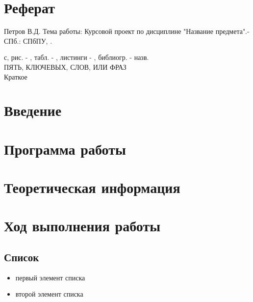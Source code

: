 




\section*{\centering Реферат}

Петров В.Д. Тема работы: Курсовой проект по дисциплине "Название предмета".- СПб.: СПбПУ, \the\year. \begin{NoHyper}{\pageref{LastPage}}\end{NoHyper}  с, рис. - \totalfigures{}, табл. - \totaltables{}, листинги - , библиогр. -  назв.\\[1cm]

ПЯТЬ, КЛЮЧЕВЫХ, СЛОВ, ИЛИ ФРАЗ\\

Краткое 

\thispagestyle{empty} %
\newpage



\renewcommand\contentsname{\centerline{Содержание}}
\tableofcontents
\newpage



\section*{Введение}


\section{Программа работы}


\section{Теоретическая информация}


\section{Ход выполнения работы}

\subsection{Список}

\begin{itemize}
\item первый элемент списка
\item второй элемент списка
\end{itemize}


